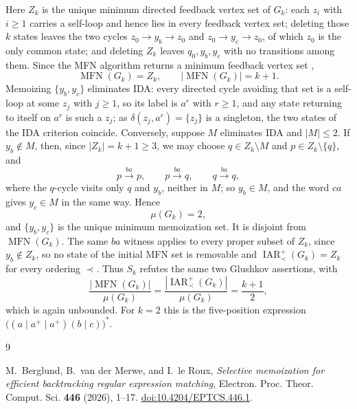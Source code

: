 \documentclass[11pt]{amsart}
\newcommand{\MFN}{\operatorname{MFN}}
\newcommand{\IARp}{\operatorname{IAR}^{+}}
\begin{document}
Here $Z_k$ is the unique minimum directed feedback vertex set of $G_k$:
each $z_i$ with $i\ge 1$ carries a self-loop and hence lies in every
feedback vertex set; deleting those $k$ states leaves the two cycles
$z_0\to y_b\to z_0$ and $z_0\to y_c\to z_0$, of which $z_0$ is the only
common state; and deleting $Z_k$ leaves $q_0,y_b,y_c$ with no
transitions among them. Since the MFN algorithm returns a minimum
feedback vertex set \cite[Theorem~4]{BerglundEtAl2026},
\[
\MFN(G_k)=Z_k,
\qquad
|\MFN(G_k)|=k+1.
\]
Memoizing $\{y_b,y_c\}$ eliminates IDA: every directed cycle avoiding
that set is a self-loop at some $z_j$ with $j\ge 1$, so its label is
$a^r$ with $r\ge 1$, and any state returning to itself on $a^r$ is such
a $z_j$; as $\delta(z_j,a^r)=\{z_j\}$ is a singleton, the two states of
the IDA criterion coincide. Conversely, suppose $M$ eliminates IDA and
$|M|\le 2$. If $y_b\notin M$, then, since $|Z_k|=k+1\ge 3$, we may
choose $q\in Z_k\setminus M$ and $p\in Z_k\setminus\{q\}$, and
\[
p\xrightarrow{ba}p,
\qquad
p\xrightarrow{ba}q,
\qquad
q\xrightarrow{ba}q,
\]
where the $q$-cycle visits only $q$ and $y_b$, neither in $M$; so
$y_b\in M$, and the word $ca$ gives $y_c\in M$ in the same way. Hence
\[
\mu(G_k)=2,
\]
and $\{y_b,y_c\}$ is the unique minimum memoization set. It is disjoint
from $\MFN(G_k)$. The same $ba$ witness applies to every proper subset
of $Z_k$, since $y_b\notin Z_k$, so no state of the initial MFN set is
removable and $\IARp_{\prec}(G_k)=Z_k$ for every ordering $\prec$. Thus
$S_k$ refutes the same two Glushkov assertions, with
\[
\frac{|\MFN(G_k)|}{\mu(G_k)}
=
\frac{|\IARp_{\prec}(G_k)|}{\mu(G_k)}
=
\frac{k+1}{2},
\]
which is again unbounded. For $k=2$ this is the five-position
expression $\bigl((a\mid a^+\mid a^+)(b\mid c)\bigr)^*$.

\begin{thebibliography}{9}

M.~Berglund, B.~van der Merwe, and I.~le Roux,
\emph{Selective memoization for efficient backtracking regular
expression matching},
Electron. Proc. Theor. Comput. Sci. \textbf{446} (2026), 1--17.
\href{https://doi.org/10.4204/EPTCS.446.1}
{doi:10.4204/EPTCS.446.1}.

\end{thebibliography}
\end{document}
